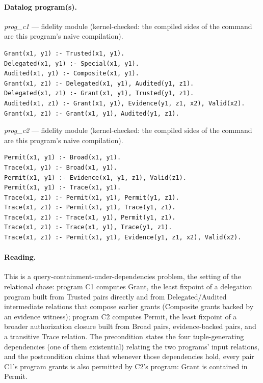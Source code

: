 \documentclass[10pt]{article}
\begin{document}
\paragraph{Datalog program(s).}

{\raggedright\textit{prog\_c1} --- fidelity module (kernel-checked: the compiled sides of the command are this program's naive compilation).\par}

\begin{Verbatim}[fontsize=\scriptsize,breaklines=true,breakanywhere=true,frame=single,framesep=1.5mm]
Grant(x1, y1) :- Trusted(x1, y1).
Delegated(x1, y1) :- Special(x1, y1).
Audited(x1, y1) :- Composite(x1, y1).
Grant(x1, z1) :- Delegated(x1, y1), Audited(y1, z1).
Delegated(x1, z1) :- Grant(x1, y1), Trusted(y1, z1).
Audited(x1, z1) :- Grant(x1, y1), Evidence(y1, z1, x2), Valid(x2).
Grant(x1, z1) :- Grant(x1, y1), Audited(y1, z1).
\end{Verbatim}

{\raggedright\textit{prog\_c2} --- fidelity module (kernel-checked: the compiled sides of the command are this program's naive compilation).\par}

\begin{Verbatim}[fontsize=\scriptsize,breaklines=true,breakanywhere=true,frame=single,framesep=1.5mm]
Permit(x1, y1) :- Broad(x1, y1).
Trace(x1, y1) :- Broad(x1, y1).
Permit(x1, y1) :- Evidence(x1, y1, z1), Valid(z1).
Permit(x1, y1) :- Trace(x1, y1).
Trace(x1, z1) :- Permit(x1, y1), Permit(y1, z1).
Trace(x1, z1) :- Permit(x1, y1), Trace(y1, z1).
Trace(x1, z1) :- Trace(x1, y1), Permit(y1, z1).
Trace(x1, z1) :- Trace(x1, y1), Trace(y1, z1).
Trace(x1, z1) :- Permit(x1, y1), Evidence(y1, z1, x2), Valid(x2).
\end{Verbatim}

\paragraph{Reading.} This is a query-containment-under-dependencies problem, the setting of the relational chase: program C1 computes Grant, the least fixpoint of a delegation program built from Trusted pairs directly and from Delegated/Audited intermediate relations that compose earlier grants (Composite grants backed by an evidence witness); program C2 computes Permit, the least fixpoint of a broader authorization closure built from Broad pairs, evidence-backed pairs, and a transitive Trace relation. The precondition states the four tuple-generating dependencies (one of them existential) relating the two programs' input relations, and the postcondition claims that whenever those dependencies hold, every pair C1's program grants is also permitted by C2's program: Grant is contained in Permit.
\end{document}
